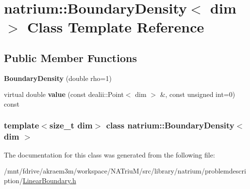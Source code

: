 \hypertarget{classnatrium_1_1BoundaryDensity}{
\section{natrium::BoundaryDensity$<$ dim $>$ Class Template Reference}
\label{classnatrium_1_1BoundaryDensity}
}
\subsection*{Public Member Functions}
\begin{DoxyCompactItemize}
\item 
\hypertarget{classnatrium_1_1BoundaryDensity_ae0a089b2927316bb6903ac6fcf20e26b}{
{\bfseries BoundaryDensity} (double rho=1)}
\label{classnatrium_1_1BoundaryDensity_ae0a089b2927316bb6903ac6fcf20e26b}

\item 
\hypertarget{classnatrium_1_1BoundaryDensity_af8fcef848578f2e75d6aad467b38244f}{
virtual double {\bfseries value} (const dealii::Point$<$ dim $>$ \&, const unsigned int=0) const }
\label{classnatrium_1_1BoundaryDensity_af8fcef848578f2e75d6aad467b38244f}

\end{DoxyCompactItemize}
\subsubsection*{template$<$size\_\-t dim$>$ class natrium::BoundaryDensity$<$ dim $>$}



The documentation for this class was generated from the following file:\begin{DoxyCompactItemize}
\item 
/mnt/fdrive/akraem3m/workspace/NATriuM/src/library/natrium/problemdescription/\hyperlink{LinearBoundary_8h}{LinearBoundary.h}\end{DoxyCompactItemize}
